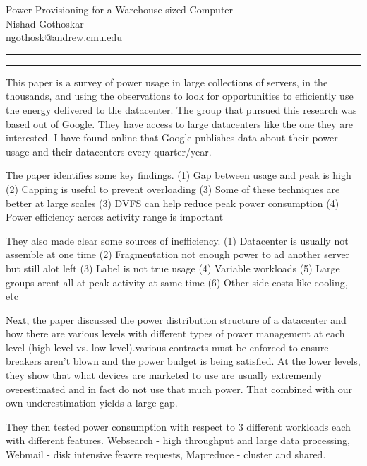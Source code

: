 \documentclass[11pt]{article}
\newcommand{\question}[2] {\vspace{.25in} \hrule\vspace{0.5em}
	\noindent{\bf #1: #2} \vspace{0.5em}
	\hrule \vspace{.10in}}
\newcommand{\myname}{Nishad Gothoskar}
\newcommand{\myandrew}{ngothosk}
\begin{document}
	
	\medskip                        %
	
	\thispagestyle{plain}
	\begin{center}                  %
		{\Large Power Provisioning for a Warehouse-sized Computer} \\
		\myname \\
		\myandrew @andrew.cmu.edu\\
	\end{center}
	
	\question{1}{Summary}
	\quad This paper is a survey of power usage in large collections of servers, in the thousands, and using the observations to look for opportunities to efficiently use the energy delivered to the datacenter. The group that pursued this research was based out of Google. They have access to large datacenters like the one they are interested. I have found online that Google publishes data about their power usage and their datacenters every quarter/year.
	
	\quad The paper identifies some key findings. (1) Gap between usage and peak is high (2) Capping is useful to prevent overloading (3) Some of these techniques are better at large scales (3) DVFS can help reduce peak power consumption (4) Power efficiency across activity range is important
	
	\quad They also made clear some sources of inefficiency. (1) Datacenter is usually not assemble at one time (2) Fragmentation not enough power to ad another server but still alot left (3) Label is not true usage (4) Variable workloads (5) Large groups arent all at peak activity at same time (6) Other side costs like cooling, etc
	
	\quad Next, the paper discussed the power distribution structure of a datacenter and how there are various levels with different types of power management at each level (high level vs. low level).various contracts must be enforced to ensure breakers aren't blown and the power budget is being satisfied. At the lower levels, they show that what devices are marketed to use are usually extrememly overestimated and in fact do not use that much power. That combined with our own underestimation yields a large gap.
	
	\quad They then tested power consumption with respect to 3 different workloads each with different features. Websearch - high throughput and large data processing, Webmail - disk intensive fewere requests, Mapreduce - cluster and shared.
	
\end{document}
